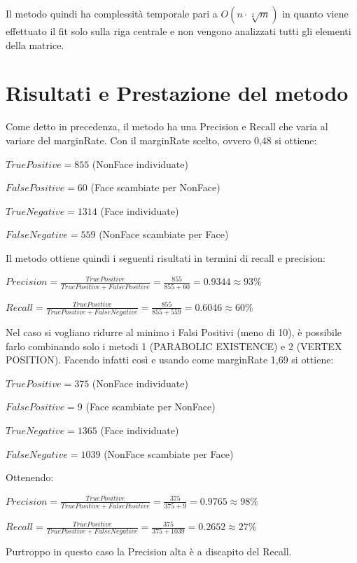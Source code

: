 \documentclass[
  italian,
]{article}
\begin{document}
Il metodo quindi ha complessità temporale pari a \(O(n \cdot \sqrt[2]{m})\) in
quanto viene effettuato il fit solo sulla riga centrale e non vengono analizzati tutti gli elementi della matrice.

\hypertarget{risultati-e-prestazione-del-metodo}{%
\section{Risultati e Prestazione del
metodo}\label{risultati-e-prestazione-del-metodo}}

Come detto in precedenza, il metodo ha una Precision e Recall che varia al variare del marginRate.
Con il marginRate scelto, ovvero 0,48 si ottiene:

\(True Positive = 855\) (NonFace individuate)

\(False Positive = 60\) (Face scambiate per NonFace)

\(True Negative = 1314\) (Face individuate)

\(False Negative = 559\) (NonFace scambiate per Face)

\bigskip
Il metodo ottiene quindi i seguenti risultati in termini di recall e
precision:

\(Precision = \frac{TruePositive}{TruePositive + FalsePositive} = \frac{855}{855+60} = 0.9344 \approx 93\%\)

\(Recall = \frac{TruePositive}{TruePositive + FalseNegative} = \frac{855}{855+559} = 0.6046 \approx 60\%\)

\pagebreak

Nel caso si vogliano ridurre al minimo i Falsi Positivi (meno di 10), è possibile farlo combinando solo i metodi 1 (PARABOLIC EXISTENCE) e 2 (VERTEX POSITION).
Facendo infatti così e usando come marginRate 1,69 si ottiene:

\(True Positive = 375\) (NonFace individuate)

\(False Positive = 9\) (Face scambiate per NonFace)

\(True Negative = 1365\) (Face individuate)

\(False Negative = 1039\) (NonFace scambiate per Face)

Ottenendo:

\(Precision = \frac{TruePositive}{TruePositive + FalsePositive} = \frac{375}{375+9} = 0.9765 \approx 98\%\)

\(Recall = \frac{TruePositive}{TruePositive + FalseNegative} = \frac{375}{375+1039} = 0.2652 \approx 27\%\)

Purtroppo in questo caso la Precision alta è a discapito del Recall.
\end{document}
